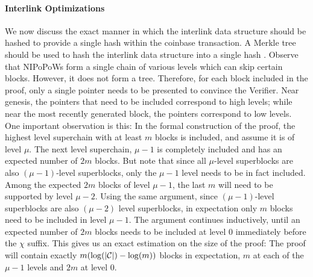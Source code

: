 \paragraph{Interlink Optimizations}
We now discuss the exact manner in which the interlink data structure should be
hashed to provide a single hash within the coinbase transaction.  A Merkle tree
should be used to hash the interlink data structure into a single hash
\cite{KLS}.  Observe that NIPoPoWs form a single chain of various levels which
can skip certain blocks. However, it does not form a tree. Therefore, for each
block included in the proof, only a single pointer needs to be presented to
convince the Verifier. Near genesis, the pointers that need to be included
correspond to high levels; while near the most recently generated block, the
pointers correspond to low levels. One important observation is this: In the
formal construction of the proof, the highest level superchain with at least
$m$ blocks is included, and assume it is of level $\mu$. The next level
superchain, $\mu - 1$ is completely included and has an expected number of $2m$
blocks. But note that since all $\mu$-level superblocks are also $(\mu -
1)$-level superblocks, only the $\mu - 1$ level needs to be in fact included.
Among the expected $2m$ blocks of level $\mu - 1$, the last $m$ will need to be
supported by level $\mu - 2$. Using the same argument, since $(\mu - 1)$-level
superblocks are also $(\mu - 2)$ level superblocks, in expectation only $m$
blocks need to be included in level $\mu - 1$. The argument continues
inductively, until an expected number of $2m$ blocks needs to be included at
level $0$ immediately before the $\chi$ suffix.  This gives us an exact
estimation on the size of the proof: The proof will contain exactly $m
(\log(|\mathcal{C}|) - \log(m))$ blocks in expectation, $m$ at each of the $\mu - 1$
levels and $2m$ at level $0$.


